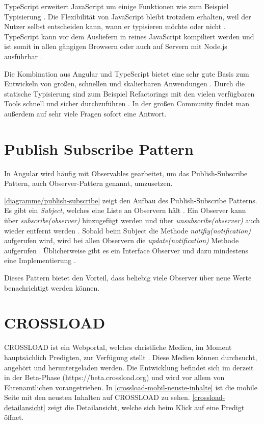 TypeScript erweitert JavaScript um einige Funktionen wie zum Beispiel Typisierung \autocite{typescript-org}. Die Flexibilität von JavaScript bleibt trotzdem erhalten, weil der Nutzer selbst entscheiden kann, wann er typisieren möchte oder nicht \autocite{typescript-org}. TypeScript kann vor dem Ausliefern in reines JavaScript kompiliert werden und ist somit in allen gängigen Browsern oder auch auf Servern mit Node.js ausführbar \autocite{typescript-org}.

Die Kombination aus Angular und TypeScript bietet eine sehr gute Basis zum Entwickeln von großen, schnellen und skalierbaren Anwendungen \autocite{angular-io}. Durch die statische Typisierung sind zum Beispiel Refactorings mit den vielen verfügbaren Tools schnell und sicher durchzuführen \autocite{typescript-org} \autocite{angular-io}. In der großen Community findet man außerdem auf sehr viele Fragen sofort eine Antwort.

\section{Publish Subscribe Pattern}
In Angular wird häufig mit Observables gearbeitet, um das Publish-Subscribe Pattern, auch Observer-Pattern genannt, umzusetzen. 


\autoref{diagramme/publish-subscribe} zeigt den Aufbau des Publish-Subscribe Patterns. Es gibt ein \textit{Subject}, welches eine Liste an Observern hält \autocite{Mezzalira2018}. Ein Observer kann über \textit{subscribe(observer)} hinzugefügt werden und über \textit{unsubscribe(observer)} auch wieder entfernt werden \autocite{Mezzalira2018}. Sobald beim Subject die Methode \textit{notifiy(notification)} aufgerufen wird, wird bei allen Observern die \textit{update(notification)} Methode aufgerufen \autocite{Mezzalira2018}. Üblicherweise gibt es ein Interface Observer und dazu mindestens eine Implementierung \autocite{Mezzalira2018}.

Dieses Pattern bietet den Vorteil, dass beliebig viele Observer über neue Werte benachrichtigt werden können. 

\section{CROSSLOAD}
CROSSLOAD ist ein Webportal, welches christliche Medien, im Moment hauptsächlich Predigten, zur Verfügung stellt \autocite{crossload-org}. Diese Medien können durchsucht, angehört und heruntergeladen werden. Die Entwicklung befindet sich im derzeit in der Beta-Phase (https://beta.crossload.org) und wird vor allem von Ehrenamtlichen vorangetrieben. In \autoref{crossload-mobil-neuste-inhalte} ist die mobile Seite mit den neusten Inhalten auf CROSSLOAD zu sehen. \autoref{crossload-detailansicht} zeigt die Detailansicht, welche sich beim Klick auf eine Predigt öffnet.

